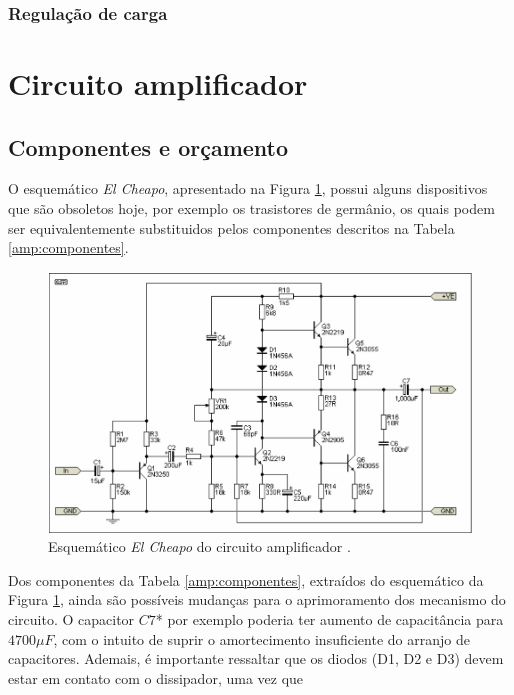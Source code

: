 \documentclass[a4paper,12pt,oneside,openany,table,xcdraw]{article}
\begin{document}
\subsubsection{Regulação de carga}


\newpage
\section{Circuito amplificador} \label{amp}
\subsection{Componentes e orçamento} 
O esquemático \emph{El Cheapo}, apresentado na Figura \ref{amp:esquematico}, possui alguns dispositivos que são obsoletos hoje, por exemplo os trasistores de germânio, os quais podem ser equivalentemente substituidos pelos componentes descritos na Tabela \ref{amp:componentes}. 
\vspace{0.2cm}

\begin{figure}[H]
\centering
\includegraphics[width=15cm]{amp-esquematico}
\caption{Esquemático \emph{El Cheapo} do circuito amplificador \cite{cheapo}.}
\label{amp:esquematico}
\end{figure}

\vspace{0.4cm}
Dos componentes da Tabela \ref{amp:componentes}, extraídos do esquemático da Figura \ref{amp:esquematico}, ainda são possíveis mudanças para o aprimoramento dos mecanismo do circuito. O capacitor $C7$* por exemplo poderia ter aumento de capacitância para $4700 \mu F$, com o intuito de suprir o amortecimento insuficiente do arranjo de capacitores. %
Ademais, é importante ressaltar que os diodos (D1, D2 e D3) devem estar em contato com o dissipador, uma vez que %
\end{document}
